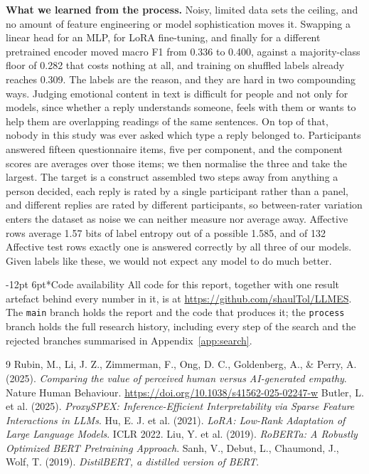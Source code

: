 \documentclass[11pt,a4paper]{article}
\makeatletter
\renewcommand\section{\@startsection{section}{1}{\z@}%
  {-12pt \@plus -3pt \@minus -2pt}{6pt}{\normalfont\large\bfseries}}
\makeatother
\begin{document}
\textbf{What we learned from the process.}\label{sec:learned}
Noisy, limited data sets the ceiling, and no amount of
feature engineering or model sophistication moves it. Swapping a linear head for an MLP, for
LoRA fine-tuning, and finally for a different pretrained encoder moved macro F1 from 0.336 to
0.400, against a majority-class floor of 0.282 that costs nothing at all, and training on
shuffled labels already reaches 0.309. The labels are the reason, and they are hard in two compounding ways. Judging emotional
content in text is difficult for people and not only for models, since whether a reply
understands someone, feels with them or wants to help them are overlapping readings of the
same sentences. On top of that, nobody in this study was ever asked which type a reply
belonged to. Participants answered fifteen questionnaire items, five per component, and the
component scores are averages over those items; we then normalise the three and take the
largest. The target is a construct assembled two steps away from anything a person decided,
each reply is rated by a single participant rather than a panel, and different replies are
rated by different participants, so between-rater variation enters the dataset as noise we
can neither measure nor average away. Affective rows average 1.57 bits of label entropy out
of a possible 1.585, and of 132 Affective test rows exactly one is answered correctly by all
three of our models. Given labels like these, we would not expect any model to do much
better.

\section*{Code availability}
All code for this report, together with one result artefact behind every number in it, is at
\url{https://github.com/shaulTol/LLMES}. The \texttt{main} branch holds the report and the
code that produces it; the \texttt{process} branch holds the full research history,
including every step of the search and the rejected branches summarised in
Appendix~\ref{app:search}.

\begin{thebibliography}{9}
 Rubin, M., Li, J. Z., Zimmerman, F., Ong, D. C., Goldenberg, A., \&
Perry, A. (2025). \emph{Comparing the value of perceived human versus AI-generated empathy}.
Nature Human Behaviour. \url{https://doi.org/10.1038/s41562-025-02247-w}
 Butler, L. et al. (2025). \emph{ProxySPEX: Inference-Efficient
Interpretability via Sparse Feature Interactions in LLMs}.
 Hu, E. J. et al. (2021). \emph{LoRA: Low-Rank Adaptation of Large Language
Models}. ICLR 2022.
 Liu, Y. et al. (2019). \emph{RoBERTa: A Robustly Optimized BERT
Pretraining Approach}.
 Sanh, V., Debut, L., Chaumond, J., Wolf, T. (2019). \emph{DistilBERT,
a distilled version of BERT}.
\end{thebibliography}
\end{document}
